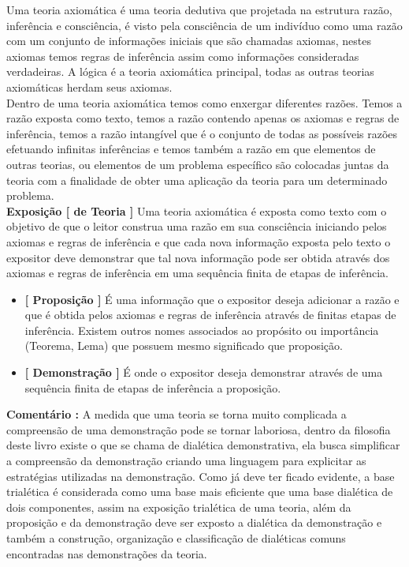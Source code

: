 \documentclass[10pt,a4paper]{report}
\begin{document}
\hspace{\baselineskip}

Uma teoria axiomática é uma teoria dedutiva que projetada na estrutura razão, inferência e consciência, é visto pela consciência de um indivíduo como uma razão com um conjunto de informações iniciais que são chamadas axiomas, nestes axiomas temos regras de inferência assim como informações consideradas verdadeiras. A lógica é a teoria axiomática principal, todas as outras teorias axiomáticas herdam seus axiomas.\\

Dentro de uma teoria axiomática temos como enxergar diferentes razões. Temos a razão exposta como texto, temos a razão contendo apenas os axiomas e regras de inferência, temos a razão intangível que é o conjunto de todas as possíveis razões efetuando infinitas inferências e temos também a razão em que elementos de outras teorias, ou elementos de um problema específico são colocadas juntas da teoria com a finalidade de obter uma aplicação da teoria para um determinado problema.\\

\textbf{Exposição [ de Teoria ]} Uma teoria axiomática é exposta como texto com o objetivo de que o leitor construa uma razão em sua consciência iniciando pelos axiomas e regras de inferência e que cada nova informação exposta pelo texto o expositor deve demonstrar que tal nova informação pode ser obtida através dos axiomas e regras de inferência em uma sequência finita de etapas de inferência.

\begin{itemize}
	\item[ (i) ] \textbf{[ Proposição ]} É uma informação que o expositor deseja adicionar a razão e que é obtida pelos axiomas e regras de inferência através de finitas etapas de inferência. Existem outros nomes associados ao propósito ou importância (Teorema, Lema) que possuem mesmo significado que proposição.
	\item[ (ii) ] \textbf{[ Demonstração ]} É onde o expositor deseja demonstrar através de uma sequência finita de etapas de inferência a proposição.
\end{itemize}

\textbf{Comentário :} A medida que uma teoria se torna muito complicada a compreensão de uma demonstração pode se tornar laboriosa, dentro da filosofia deste livro existe o que se chama de dialética demonstrativa, ela busca simplificar a compreensão da demonstração criando uma linguagem para explicitar as estratégias utilizadas na demonstração. Como já deve ter ficado evidente, a base trialética é considerada como uma base mais eficiente que uma base dialética de dois componentes, assim na exposição trialética de uma teoria, além da proposição e da demonstração deve ser exposto a dialética da demonstração e também a construção, organização e classificação de dialéticas comuns encontradas nas demonstrações da teoria.
\end{document}

